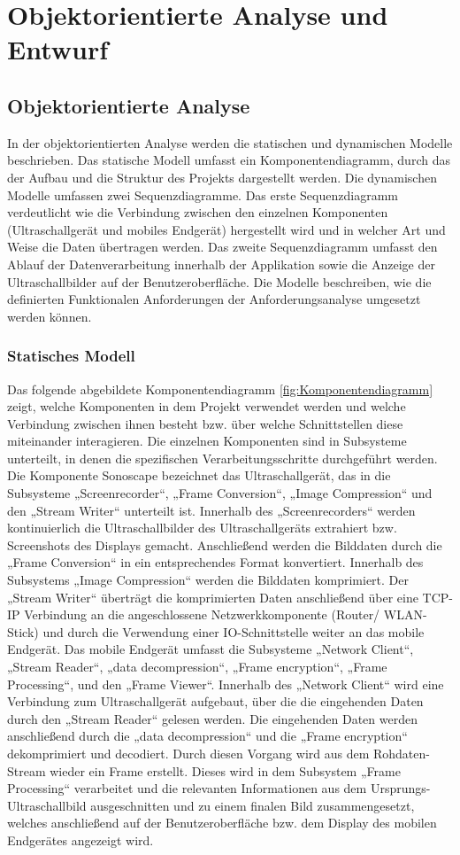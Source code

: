\chapter{Objektorientierte Analyse und Entwurf}
\section{Objektorientierte Analyse}
In der objektorientierten Analyse werden die statischen und dynamischen Modelle beschrieben. Das statische Modell umfasst ein Komponentendiagramm, durch das der Aufbau und die Struktur des Projekts dargestellt werden. Die dynamischen Modelle umfassen zwei Sequenzdiagramme. Das erste Sequenzdiagramm verdeutlicht wie die Verbindung zwischen den einzelnen Komponenten (Ultraschallgerät und mobiles Endgerät) hergestellt wird und in welcher Art und Weise die Daten übertragen werden. Das zweite Sequenzdiagramm umfasst den Ablauf der Datenverarbeitung innerhalb der Applikation sowie die Anzeige der Ultraschallbilder auf der Benutzeroberfläche. Die Modelle beschreiben, wie die definierten Funktionalen Anforderungen der Anforderungsanalyse umgesetzt werden können. 
\subsection{Statisches Modell}
Das folgende abgebildete Komponentendiagramm \ref{fig:Komponentendiagramm} zeigt, welche Komponenten in dem Projekt verwendet werden und welche Verbindung zwischen ihnen besteht bzw. über welche Schnittstellen diese miteinander interagieren. Die  einzelnen Komponenten sind in Subsysteme unterteilt, in denen die spezifischen Verarbeitungsschritte durchgeführt werden.  Die Komponente Sonoscape bezeichnet das Ultraschallgerät, das in die Subsysteme „Screenrecorder“, „Frame Conversion“, „Image Compression“ und den „Stream Writer“ unterteilt ist. Innerhalb des „Screenrecorders“ werden kontinuierlich die Ultraschallbilder des Ultraschallgeräts extrahiert bzw. Screenshots des Displays gemacht. Anschließend werden die Bilddaten durch die „Frame Conversion“ in ein entsprechendes Format konvertiert. Innerhalb des Subsystems „Image Compression“ werden die Bilddaten komprimiert. Der „Stream Writer“ überträgt die komprimierten Daten anschließend über eine TCP-IP Verbindung an die angeschlossene Netzwerkkomponente (Router/ WLAN-Stick) und durch die Verwendung einer IO-Schnittstelle weiter an das mobile Endgerät. Das mobile Endgerät umfasst die Subsysteme „Network Client“, „Stream Reader“, „data decompression“, „Frame encryption“, „Frame Processing“, und den „Frame Viewer“. Innerhalb des „Network Client“ wird eine Verbindung zum Ultraschallgerät aufgebaut, über die die eingehenden Daten durch den „Stream Reader“ gelesen werden. Die eingehenden Daten werden anschließend durch die „data decompression“ und die „Frame encryption“ dekomprimiert und  decodiert. Durch diesen Vorgang wird aus dem Rohdaten-Stream wieder ein Frame erstellt. Dieses wird in dem Subsystem „Frame Processing“ verarbeitet und die relevanten Informationen aus dem Ursprungs-Ultraschallbild ausgeschnitten und zu einem finalen Bild zusammengesetzt, welches anschließend auf der Benutzeroberfläche bzw. dem Display des  mobilen Endgerätes angezeigt wird. \\

